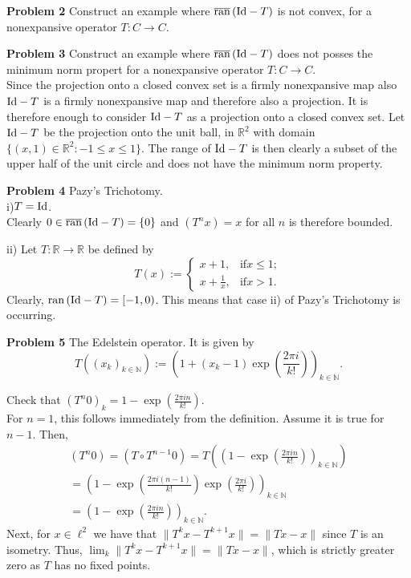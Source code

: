 \documentclass{scrartcl}
\newcommand{\N}{\mathbb{N}}
\newcommand{\R}{\mathbb{R}}
\theoremstyle{plain}
\theoremstyle{remark}
\newcommand{\Id}{\textup{Id}}
\newcommand{\ran}{\textup{ran}\,}
\newcommand{\clran}{\overline{\textup{ran}}\,}
\begin{document}
\textbf{Problem 2} Construct an example where $\clran(\Id - T)$ is not convex, for a nonexpansive operator $T:C \to C$. 


\textbf{Problem 3} Construct an example where $\clran(\Id - T)$ does not posses the minimum norm propert for a nonexpansive operator $T:C \to C$. \\
Since the projection onto a closed convex set is a firmly nonexpansive map also $\Id - T$ is a firmly nonexpansive map and therefore also a projection.
It is therefore enough to consider $\Id - T$ as a projection onto a closed convex set.
Let $\Id - T$ be the projection onto the unit ball, in $\R^2$ with domain $\{(x, 1) \in \R^2 : -1 \le x\le 1\}$.
The range of $\Id - T$ is then clearly a subset of the upper half of the unit circle and does not have the minimum norm property.


\textbf{Problem 4} Pazy's Trichotomy.\\
i)$T=\Id$.\\
Clearly $0 \in \clran(\Id - T) = \{0\}$ and $(T^{n}x) = x$ for all $n$ is therefore bounded.

ii) Let $T: \R \to \R$  be defined by
\begin{equation}
  T(x) := 
  \begin{cases}
    x+1, & \text{if} x\le1; \\
    x+\frac{1}{x}, & \text{if} x > 1.
  \end{cases}
\end{equation}
Clearly, $\ran(\Id - T) = [-1, 0)$.
This means that case ii) of Pazy's Trichotomy is occurring.



\textbf{Problem 5} The Edelstein operator.
It is given by 
\begin{equation}
  T\left({(x_{k})}_{k \in \N}\right) := {\left( 1 + (x_{k} - 1)\exp \left(\frac{2 \pi i}{k!}\right)\right)}_{k \in \N}.
\end{equation}

Check that ${(T^{n}0)}_{k} = 1 - \exp \left(\frac{2 \pi i n}{k!}\right)$.\\

For $n=1$, this follows immediately from the definition.
Assume it is true for $n-1$. Then,
\begin{equation}
  \begin{aligned}
    {(T^{n}0)} = {(T \circ T^{n-1}0)} = T \left( {\left(1 - \exp \left(\frac{2 \pi i n}{k!}\right)\right)}_{k \in \N} \right) \\
    = {\left( 1 - \exp\left(\frac{2 \pi i (n-1)}{k!}\right)\exp \left(\frac{2 \pi i}{k!}\right)\right)}_{k \in \N} \\
    = {\left( 1 - \exp \left(\frac{2 \pi i n }{k!}\right)\right)}_{k \in \N}.
  \end{aligned}
\end{equation}
Next, for $x \in \ell^2$ we have that $\lVert T^{k}x - T^{k+1}x \rVert = \lVert Tx - x \rVert$ since $T$ is an isometry.
Thus, $\lim_{k} \lVert T^{k}x - T^{k+1}x \rVert = \lVert Tx - x \rVert$, which is strictly greater zero as $T$ has no fixed points.
\end{document}
